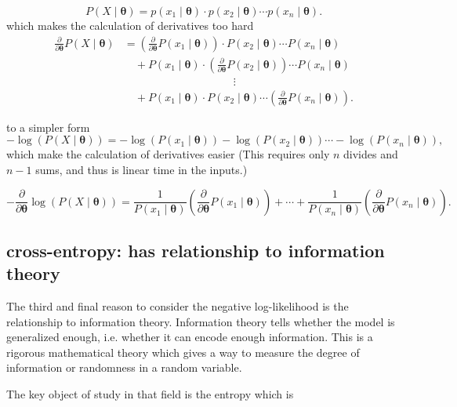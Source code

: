 $$
P(X\mid\boldsymbol{\theta}) = p(x_1\mid\boldsymbol{\theta})\cdot p(x_2\mid\boldsymbol{\theta})\cdots p(x_n\mid\boldsymbol{\theta}).
$$
which makes the calculation of derivatives too hard
$$
\begin{aligned}
\frac{\partial}{\partial \boldsymbol{\theta}} P(X\mid\boldsymbol{\theta}) & = \left(\frac{\partial}{\partial \boldsymbol{\theta}}P(x_1\mid\boldsymbol{\theta})\right)\cdot P(x_2\mid\boldsymbol{\theta})\cdots P(x_n\mid\boldsymbol{\theta}) \\
& \quad + P(x_1\mid\boldsymbol{\theta})\cdot \left(\frac{\partial}{\partial \boldsymbol{\theta}}P(x_2\mid\boldsymbol{\theta})\right)\cdots P(x_n\mid\boldsymbol{\theta}) \\
& \quad \quad \quad \quad \quad \quad \quad \quad \quad \quad \vdots \\
& \quad + P(x_1\mid\boldsymbol{\theta})\cdot P(x_2\mid\boldsymbol{\theta}) \cdots \left(\frac{\partial}{\partial \boldsymbol{\theta}}P(x_n\mid\boldsymbol{\theta})\right).
\end{aligned}
$$

to a simpler form
$$
-\log\left(P(X\mid\boldsymbol{\theta})\right) = -\log(P(x_1\mid\boldsymbol{\theta})) - \log(P(x_2\mid\boldsymbol{\theta})) \cdots - \log(P(x_n\mid\boldsymbol{\theta})),
$$
which make the calculation of derivatives easier (This requires only $n$ divides and $n-1$ sums, and thus is linear time in the inputs.)
 
$$
- \frac{\partial}{\partial \boldsymbol{\theta}} \log\left(P(X\mid\boldsymbol{\theta})\right) = \frac{1}{P(x_1\mid\boldsymbol{\theta})}\left(\frac{\partial}{\partial \boldsymbol{\theta}}P(x_1\mid\boldsymbol{\theta})\right) + \cdots + \frac{1}{P(x_n\mid\boldsymbol{\theta})}\left(\frac{\partial}{\partial \boldsymbol{\theta}}P(x_n\mid\boldsymbol{\theta})\right).
$$

\subsection{cross-entropy: has relationship to information theory}

The third and final reason to consider the negative log-likelihood is the relationship to information theory.
Information theory tells whether the model is generalized enough, i.e. whether it can encode enough information.
This is a rigorous mathematical theory which gives a way to measure the degree of information or randomness in a random variable.


The key object of study in that field is the entropy which is 

